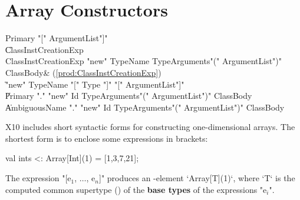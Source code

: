 \section{Array Constructors}
\label{sect:ArrayCtors}


\begin{bbgrammar}
             Primary \: 
                    \xcd"[" ArgumentList\opt \xcd"]" \\
                    \| ClassInstCreationExp \\

ClassInstCreationExp \: \xcd"new" TypeName TypeArguments\opt \xcd"(" ArgumentList\opt \xcd")" ClassBody\opt & (\ref{prod:ClassInstCreationExp}) \\
                    \| \xcd"new" TypeName \xcd"[" Type \xcd"]" \xcd"[" ArgumentList\opt \xcd"]" \\
                    \| Primary \xcd"." \xcd"new" Id TypeArguments\opt \xcd"(" ArgumentList\opt \xcd")" ClassBody\opt \\
                    \| AmbiguousName \xcd"." \xcd"new" Id TypeArguments\opt \xcd"(" ArgumentList\opt \xcd")" ClassBody\opt \\
\end{bbgrammar}

X10 includes short syntactic forms for constructing one-dimensional arrays.
The shortest form is to enclose some expressions in brackets: 
\begin{xten}
val ints <: Array[Int](1) = [1,3,7,21];
\end{xten}

The expression \xcdmath"[e$_1$, $\ldots$, e$_n$]" produces an -element
\xcd`Array[T](1)`, where \xcd`T` is the computed common supertype () of the {\bf
base types} of the expressions  \xcdmath"e$_i$". 

